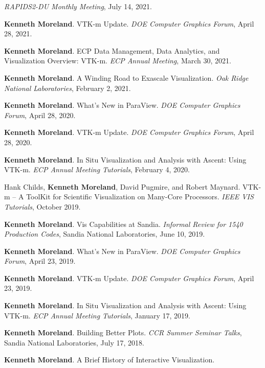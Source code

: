 \begin{enumerate}[label={[\arabic*]}, left=0pt]
  \emph{RAPIDS2-DU Monthly Meeting}, July 14, 2021.
\item  %
  \textbf{Kenneth Moreland}.
  VTK-m Update.
  \emph{DOE Computer Graphics Forum}, April 28, 2021.
\item  %
  \textbf{Kenneth Moreland}.
  ECP Data Management, Data Analytics, and Visualization Overview: VTK-m.
  \emph{ECP Annual Meeting}, March 30, 2021.
\item  %
  \textbf{Kenneth Moreland}.
  A Winding Road to Exascale Visualization.
  \emph{Oak Ridge National Laboratories}, February 2, 2021.
\item  %
  \textbf{Kenneth Moreland}.
  What's New in ParaView.
  \emph{DOE Computer Graphics Forum}, April 28, 2020.
\item  %
  \textbf{Kenneth Moreland}.
  VTK-m Update.
  \emph{DOE Computer Graphics Forum}, April 28, 2020.
\item  %
  \textbf{Kenneth Moreland}.
  In Situ Visualization and Analysis with Ascent: Using VTK-m.
  \emph{ECP Annual Meeting Tutorials}, February 4, 2020.
\item  %
  Hank Childs, \textbf{Kenneth Moreland}, David Pugmire, and Robert Maynard.
  VTK-m -- A ToolKit for Scientific Visualization on Many-Core Processors.
  \emph{IEEE VIS Tutorials}, October 2019.
\item  %
  \textbf{Kenneth Moreland}.
  Vis Capabilities at Sandia.
  \emph{Informal Review for 1540 Production Codes}, Sandia National Laboratories, June 10, 2019.
\item  %
  \textbf{Kenneth Moreland}.
  What's New in ParaView.
  \emph{DOE Computer Graphics Forum}, April 23, 2019.
\item  %
  \textbf{Kenneth Moreland}.
  VTK-m Update.
  \emph{DOE Computer Graphics Forum}, April 23, 2019.
\item  %
  \textbf{Kenneth Moreland}.
  In Situ Visualization and Analysis with Ascent: Using VTK-m.
  \emph{ECP Annual Meeting Tutorials}, January 17, 2019.
\item  %
  \textbf{Kenneth Moreland}.
  Building Better Plots.
  \emph{CCR Summer Seminar Talks}, Sandia National Laboratories, July 17, 2018.
\item  %
  \textbf{Kenneth Moreland}.
  A Brief History of Interactive Visualization.

\end{enumerate}
